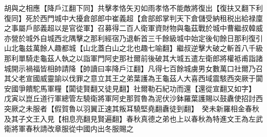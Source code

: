 胡與之相應【降戶江翻下同】共擊孝恪矢刃如雨孝恪不能敵將復出【復扶又翻下利復同】死於西門城中大擾倉部郎中崔義超【倉部郎掌判天下倉儲受納租税出給禄廩之事屬戶部義超以是官從軍】召募得二百人衛軍資財物與龜茲戰於城中曹繼叔韓威亦營於城外自城西北隅擊之那利經宿乃退斬首三千餘級城中始定後旬餘日那利復引山北龜兹萬餘人趣都城【山北蓋白山之北也趣七喻翻】繼叔逆擊大破之斬首八千級那利單騎走龜茲人執之以詣軍門阿史那社爾前後破其大城五遣左衛郎將權袛甫詣諸城開示禍福皆相帥請降【帥讀曰率降戶江翻】凡得七百餘城虜男女數萬口社爾乃召其父老宣國威靈諭以伐罪之意立其王之弟葉護為王龜茲人大喜西域震駭西突厥于闐安國爭饋駝馬軍糧【闐徒賢翻又徒見翻】社爾勒石紀功而還【還從宣翻又如字】　戊寅以崑丘道行軍總管左驍衛將軍阿史那賀魯為泥伏沙鉢羅葉護賜以鼓纛使招討西突厥之未服者【假賀魯以羽翼正速其叛耳驍堅堯翻纛徒到翻】　癸未新羅相金春秋及其子文王入見【相息亮翻見賢遍翻】春秋真德之弟也上以春秋為特進文王為左武衛將軍春秋請改章服從中國内出冬服賜之

